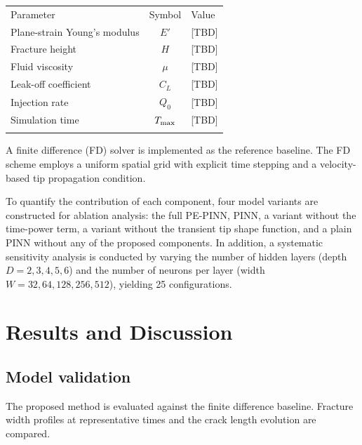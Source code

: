 \documentclass{ws-ijcm}
\begin{document}
\begin{table}[t]
{\begin{tabular}{@{}lcl@{}} \toprule
Parameter & Symbol & Value \\ \colrule
Plane-strain Young's modulus & $E'$ & [TBD] \\
Fracture height & $H$ & [TBD] \\
Fluid viscosity & $\mu$ & [TBD] \\
Leak-off coefficient & $C_L$ & [TBD] \\
Injection rate & $Q_0$ & [TBD] \\
Simulation time & $T_{\rm max}$ & [TBD] \\ \botrule
\end{tabular}}
\end{table}

A finite difference (FD) solver is implemented as the reference
baseline. The FD scheme employs a uniform spatial grid with explicit
time stepping and a velocity-based tip propagation condition.

To quantify the contribution of each component, four model variants
are constructed for ablation analysis: the full PE-PINN,
PINN, a variant without the time-power term, a variant without the
transient tip shape function, and a plain PINN without any of the
proposed components. In addition, a systematic sensitivity analysis
is conducted by varying the number of hidden layers (depth
$D = 2, 3, 4, 5, 6$) and the number of neurons per layer (width
$W = 32, 64, 128, 256, 512$), yielding 25 configurations.

\section{Results and Discussion}

\subsection{Model validation}


The proposed method is evaluated against the finite difference
baseline. Fracture width profiles at representative times and the
crack length evolution are compared.
\end{document}
